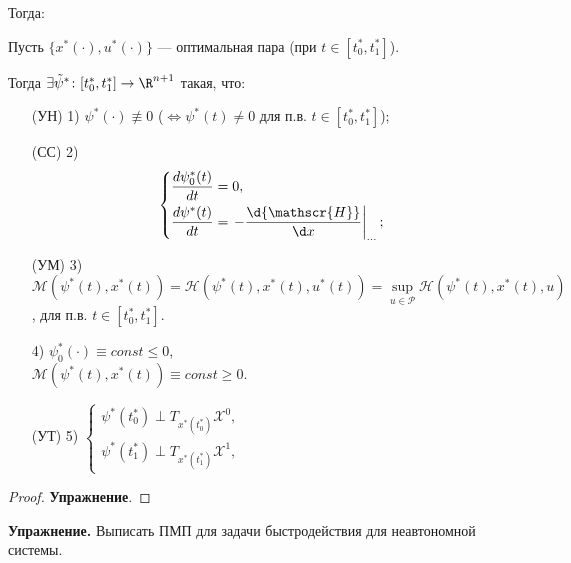 Тогда:
\begin{theorem}
    Пусть $\{x^*(\cdot), u^*(\cdot)\}$ --- оптимальная пара (при $t \in [t_0^*, t_1^*]$).

    Тогда $\exists \tilde{\psi}^* \colon [t_0^*, t_1^*] \to \R^{n+1}$ такая, что:
    \begin{enumerate}
        \item[(УН) 1)] ${\psi}^*(\cdot) \not\equiv 0$ ($\Leftrightarrow {\psi}^*(t) \neq 0$ для п.в. $t \in [t_0^*, t_1^*]$);
        \item[(СС) 2)]
        $$
        \left\{
            \begin{aligned}
                & \dfrac{d \psi_0^*(t)}{dt} = 0, \\
                & \dfrac{d \psi^*(t)}{dt} = \left. -\frac{\d {\mathscr{H}}}{\d x} \right|_{\ldots};
            \end{aligned}
        \right.
        $$
        \item[(УМ) 3)] ${\mathscr{M}}({\psi}^*(t), {x}^*(t)) = {\mathscr{H}}({\psi}^*(t), {x}^*(t), u^*(t)) = \sup\limits_{u \in \mathscr{P}} \! {\mathscr{H}}({\psi}^*(t), {x}^*(t), u)$, для п.в. $t \in [t_0^*, t_1^*]$.
        \item[4)] $\psi_0^* (\cdot) \equiv const \leqslant 0$, \\
        ${\mathscr{M}}({\psi}^*(t), {x}^*(t)) \equiv const \geqslant 0$.
        \item[(УТ) 5)] $\left\{
            \begin{matrix}
                \psi^*(t_0^*) \perp T_{x^*(t_0^*)}\mathscr{X}^0, \\
                \psi^*(t_1^*) \perp T_{x^*(t_1^*)}\mathscr{X}^1,
            \end{matrix}
            \right.$
    \end{enumerate}
\end{theorem}
\begin{proof}
    \textbf{Упражнение}.
\end{proof}

\textbf{Упражнение.} Выписать ПМП для задачи быстродействия для неавтономной системы.
